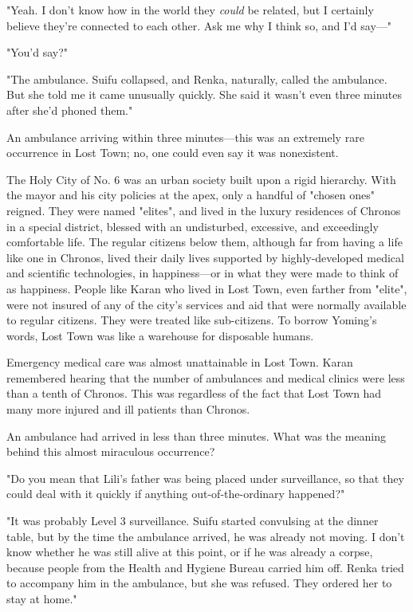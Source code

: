 "Yeah. I don't know how in the world they \emph{could} be related, but I
certainly believe they're connected to each other. Ask me why I think
so, and I'd say---"

"You'd say?"

"The ambulance. Suifu collapsed, and Renka, naturally, called the
ambulance. But she told me it came unusually quickly. She said it wasn't
even three minutes after she'd phoned them."

An ambulance arriving within three minutes---this was an extremely rare
occurrence in Lost Town; no, one could even say it was nonexistent.

The Holy City of No. 6 was an urban society built upon a rigid
hierarchy. With the mayor and his city policies at the apex, only a
handful of "chosen ones" reigned. They were named "elites", and lived in
the luxury residences of Chronos in a special district, blessed with an
undisturbed, excessive, and exceedingly comfortable life. The regular
citizens below them, although far from having a life like one in
Chronos, lived their daily lives supported by highly-developed medical
and scientific technologies, in happiness---or in what they were made to
think of as happiness. People like Karan who lived in Lost Town, even
farther from "elite", were not insured of any of the city's services and
aid that were normally available to regular citizens. They were treated
like sub-citizens. To borrow Yoming's words, Lost Town was like a
warehouse for disposable humans.

Emergency medical care was almost unattainable in Lost Town. Karan
remembered hearing that the number of ambulances and medical clinics
were less than a tenth of Chronos. This was regardless of the fact that
Lost Town had many more injured and ill patients than Chronos.

An ambulance had arrived in less than three minutes. What was the
meaning behind this almost miraculous occurrence?

"Do you mean that Lili's father was being placed under surveillance, so
that they could deal with it quickly if anything out-of-the-ordinary
happened?"

"It was probably Level 3 surveillance. Suifu started convulsing at the
dinner table, but by the time the ambulance arrived, he was already not
moving. I don't know whether he was still alive at this point, or if he
was already a corpse, because people from the Health and Hygiene Bureau
carried him off. Renka tried to accompany him in the ambulance, but she
was refused. They ordered her to stay at home."

